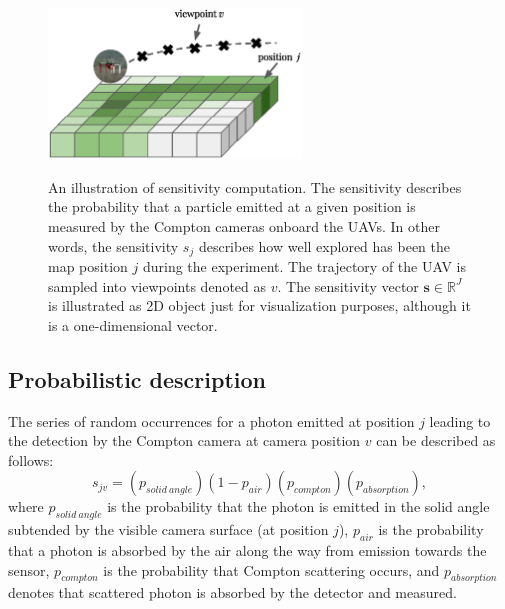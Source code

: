 \begin{figure}[!h]
  \centering
    \includegraphics[width=0.6\textwidth]{./fig/photos/sen.eps}
    \label{fig:sen_illustration}
  \caption{An illustration of sensitivity computation. 
  The sensitivity describes the probability that a particle emitted at a given position is measured by the Compton cameras onboard the \ac{UAV}s. 
  In other words, the sensitivity $s_{j}$ describes how well explored has been the map position $j$ during the experiment. 
  The trajectory of the \ac{UAV} is sampled into viewpoints denoted as $v$.
  The sensitivity vector $\mathbf{s}\in\mathbb{R}^{J}$ is illustrated as 2D object just for visualization purposes, although it is a one-dimensional vector.}
\end{figure}%

\subsection{Probabilistic description}%
The series of random occurrences for a photon emitted at position $j$ leading to the detection by the Compton camera at camera position $v$ can be described as follows:
\begin{equation}
  s_{jv} =  (p_{solid\ angle})(1-p_{air})(p_{compton})(p_{absorption}),
  \label{eq:sen_prob}
\end{equation}
where $p_{solid\ angle}$ is the probability that the photon is emitted in the solid angle subtended by the visible camera surface (at position $j$), 
$p_{air}$ is the probability that a photon is absorbed by the air along the way from emission towards the sensor, 
$p_{compton}$ is the probability that Compton scattering occurs, and $p_{absorption}$ denotes that scattered photon is absorbed by the detector and measured.


